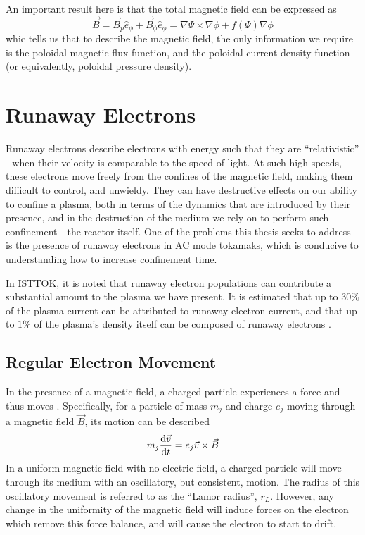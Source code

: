 \begin{remark}
    An important result here is that the total magnetic field can be expressed as 
    \begin{equation*}
        \vec{B} = \vec{B}_p \hat{e}_{\phi} + \vec{B}_{\phi} \hat{e}_{\phi}  = \nabla \Psi \times \nabla \phi + f(\Psi) \nabla \phi
    \end{equation*}
    whic tells us that to describe the magnetic field, the only information we require is 
    the poloidal magnetic flux function, and the poloidal current density function (or equivalently, 
    poloidal pressure density). 
\end{remark}


\section{Runaway Electrons}

Runaway electrons describe electrons with energy such that they are ``relativistic'' - when their velocity 
is comparable to the speed of light. At such high speeds, these electrons move freely from the confines of the 
magnetic field, making them difficult to control, and unwieldy. They can have destructive effects on our ability to confine 
a plasma, both in terms of the dynamics that are introduced by their presence, and in the destruction of the medium we rely 
on to perform such confinement - the reactor itself. One of the problems this thesis seeks to address is the presence of runaway electrons 
in AC mode tokamaks, which is conducive to understanding how to increase confinement time.

In ISTTOK, it is noted that runaway electron populations can contribute a substantial amount to the plasma we have present. 
It is estimated that up to $30\%$ of the plasma current can be attributed to runaway electron current, and that up to $1\%$ of 
the plasma's density itself can be composed of runaway electrons \cite{isttok-runaways}. 

\subsection{Regular Electron Movement}

In the presence of a magnetic field, a charged particle experiences a force and thus moves \cite{wesson-tokamaks}. Specifically, for a 
particle of mass $m_j$ and charge $e_j$ moving through a magnetic field $\vec{B}$, its motion can be described
$$m_j \dv{\vec{v}}{t} = e_j \vec{v} \times \vec{B}$$
In a uniform magnetic field with no electric field, a charged particle will move through its medium with an 
oscillatory, but consistent, motion. The radius of this oscillatory movement is referred to as the ``Lamor radius'', $r_L$. 
However, any change in the uniformity of the magnetic field will induce 
forces on the electron which remove this force balance, and will cause the electron to start to drift.

